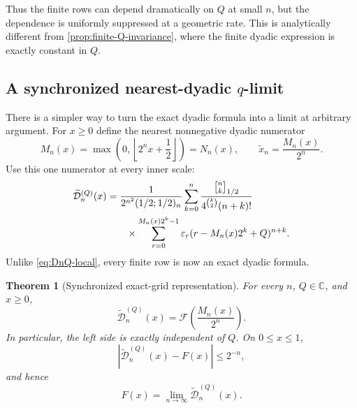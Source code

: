 \documentclass[11pt,oneside]{article}
\newtheorem{theorem}{Theorem}[section]
\theoremstyle{definition}
\theoremstyle{remark}
\newcommand{\C}{\mathbb C}
\newcommand{\qbinom}[3]{\genfrac{[}{]}{0pt}{}{#1}{#2}_{#3}}
\newcommand{\tm}{\varepsilon}
\begin{document}
Thus the finite rows can depend dramatically on $Q$ at small $n$, but the dependence is
uniformly suppressed at a geometric rate.  This is analytically different from
\cref{prop:finite-Q-invariance}, where the finite dyadic expression is exactly constant in
$Q$.

\subsection[A synchronized nearest-dyadic q-limit]{A synchronized nearest-dyadic $q$-limit}
\label{subsec:synchronized}

There is a simpler way to turn the exact dyadic formula into a limit at arbitrary argument.
For $x\ge0$ define the nearest nonnegative dyadic numerator
\begin{equation}
 M_n(x)=\max\!\left(0,\left\lfloor2^nx+\frac12\right\rfloor\right)=N_n(x),
 \qquad
 \widetilde x_n=\frac{M_n(x)}{2^n}.                        \label{eq:nearest-dyadic}
\end{equation}
Use this one numerator at every inner scale:
\begin{align}
 \widetilde{\mathcal D}_n^{(Q)}(x)
 &=\frac1{2^{n^2}(1/2;1/2)_n}
 \sum_{k=0}^{n}
 \frac{\qbinom nk{1/2}}{4^{\binom k2}(n+k)!}             \notag\\
 &\qquad\times
 \sum_{r=0}^{M_n(x)2^k-1}\tm_r
       (r-M_n(x)2^k+Q)^{n+k}.                             \label{eq:synchronized-D}
\end{align}
Unlike \eqref{eq:DnQ-local}, every finite row is now an exact dyadic formula.

\begin{theorem}[Synchronized exact-grid representation]
\label{thm:synchronized}
For every $n$, $Q\in\C$, and $x\ge0$,
\begin{equation}
 \boxed{
 \widetilde{\mathcal D}_n^{(Q)}(x)
 =\mathcal F\!\left(\frac{M_n(x)}{2^n}\right).}           \label{eq:synchronized-exact}
\end{equation}
In particular, the left side is exactly independent of $Q$.  On $0\le x\le1$,
\begin{equation}
 \left|\widetilde{\mathcal D}_n^{(Q)}(x)-F(x)\right|
 \le2^{-n},                                                \label{eq:synchronized-error}
\end{equation}
and hence
\begin{equation}
 F(x)=\lim_{n\to\infty}\widetilde{\mathcal D}_n^{(Q)}(x). \label{eq:synchronized-limit}
\end{equation}
\end{theorem}
\end{document}
